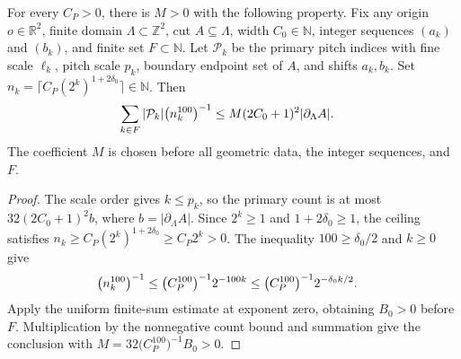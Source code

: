\begin{lemma}
    \label{thm:area_law_initial_primary_error_sum}
    \leanok
    For every $C_P>0$, there is $M>0$ with the following property.
    Fix any origin $o\in\mathbb R^2$, finite domain
    $\Lambda\subset\mathbb Z^2$, cut $A\subseteq\Lambda$, width
    $C_0\in\mathbb N$, integer sequences $(a_k)$ and $(b_k)$, and
    finite set $F\subset\mathbb N$. Let $\mathcal P_k$ be the primary
    pitch indices with fine scale $\ell_k$, pitch scale $p_k$,
    boundary endpoint set of $A$, and shifts $a_k,b_k$. Set
    $n_k=\lceil C_P(2^k)^{1+2\delta_0}\rceil\in\mathbb N$.
    Then
    \begin{align}
        \sum_{k\in F}|\mathcal P_k|\bigl(n_k^{100}\bigr)^{-1}
         & \le M(2C_0+1)^2|\partial_\Lambda A|.\notag
    \end{align}
    The coefficient $M$ is chosen before all geometric data, the
    integer sequences, and $F$.
\end{lemma}

\begin{proof}
    \leanok
    The scale order gives $k\le p_k$, so the primary count is at most
    $32(2C_0+1)^2b$, where $b=|\partial_\Lambda A|$.
    Since $2^k\ge1$ and $1+2\delta_0\ge1$, the ceiling satisfies
    $n_k\ge C_P(2^k)^{1+2\delta_0}\ge C_P2^k>0$.
    The inequality $100\ge\delta_0/2$ and $k\ge0$ give
    \begin{align}
        \bigl(n_k^{100}\bigr)^{-1}
         & \le\bigl(C_P^{100}\bigr)^{-1}2^{-100k}
        \le\bigl(C_P^{100}\bigr)^{-1}2^{-\delta_0 k/2}.\notag
    \end{align}
    Apply the uniform finite-sum estimate at exponent zero, obtaining
    $B_0>0$ before $F$. Multiplication by the nonnegative count bound
    and summation give the conclusion with
    $M=32\bigl(C_P^{100}\bigr)^{-1}B_0>0$.
\end{proof}

